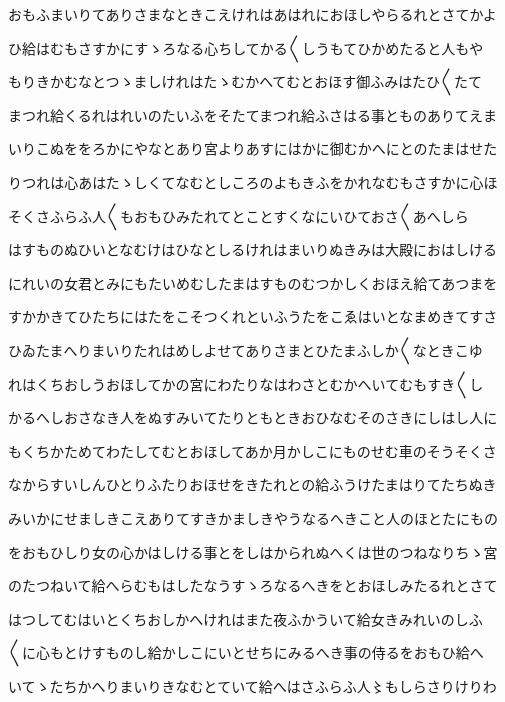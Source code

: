 \documentclass[a4paper,11pt,landscape]{ltjtarticle}
\begin{document}
\par\medskip
おもふまいりてありさまなときこえけれはあはれにおほしやらるれとさてかよ
\par\medskip
ひ給はむもさすかにすゝろなる心ちしてかる〱しうもてひかめたると人もや
\par\medskip
もりきかむなとつゝましけれはたゝむかへてむとおほす御ふみはたひ〱たて
\par\medskip
まつれ給くるれはれいのたいふをそたてまつれ給ふさはる事とものありてえま
\par\medskip
いりこぬををろかにやなとあり宮よりあすにはかに御むかへにとのたまはせた
\par\medskip
りつれは心あはたゝしくてなむとしころのよもきふをかれなむもさすかに心ほ
\par\medskip
そくさふらふ人〱もおもひみたれてとことすくなにいひておさ〱あへしら
\par\medskip
はすものぬひいとなむけはひなとしるけれはまいりぬきみは大殿におはしける
\par\medskip
にれいの女君とみにもたいめむしたまはすものむつかしくおほえ給てあつまを
\par\medskip
すかかきてひたちにはたをこそつくれといふうたをこゑはいとなまめきてすさ
\par\medskip
ひゐたまへりまいりたれはめしよせてありさまとひたまふしか〱なときこゆ
\par\medskip
れはくちおしうおほしてかの宮にわたりなはわさとむかへいてむもすき〱し
\par\medskip
かるへしおさなき人をぬすみいてたりともときおひなむそのさきにしはし人に
\par\medskip
もくちかためてわたしてむとおほしてあか月かしこにものせむ車のそうそくさ
\par\medskip
なからすいしんひとりふたりおほせをきたれとの給ふうけたまはりてたちぬき
\par\medskip
みいかにせましきこえありてすきかましきやうなるへきこと人のほとたにもの
\par\medskip
をおもひしり女の心かはしける事とをしはかられぬへくは世のつねなりちゝ宮
\par\medskip
のたつねいて給へらむもはしたなうすゝろなるへきをとおほしみたるれとさて
\par\medskip
はつしてむはいとくちおしかへけれはまた夜ふかういて給女きみれいのしふ
\par\medskip
〱に心もとけすものし給かしこにいとせちにみるへき事の侍るをおもひ給へ
\par\medskip
いてゝたちかへりまいりきなむとていて給へはさふらふ人〻もしらさりけりわ
\par\medskip
\end{document}
